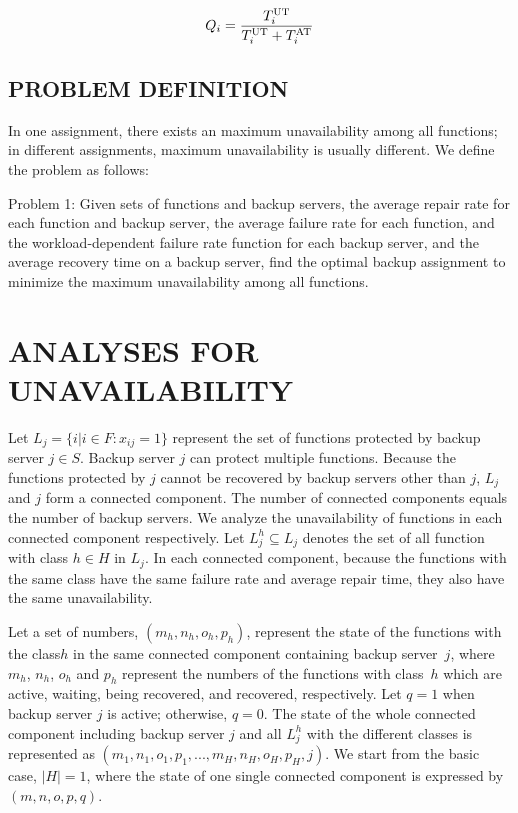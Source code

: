 \documentclass[conference]{IEEEtran}
\begin{document}
\begin{equation}
    Q_i=\frac{T_i^{\rm{UT}}}{T_i^{\rm{UT}}+T_i^{\rm{AT}}}
\end{equation}


\subsection{PROBLEM DEFINITION}
In one assignment, there exists an maximum unavailability among all functions; in different assignments, maximum unavailability is usually different. We define the problem as follows:

Problem 1: Given sets of functions and backup servers, the average repair rate for each function and backup server, the average failure rate for each function, and the workload-dependent failure rate function for each backup server, and the average recovery time on a backup server, find the optimal backup assignment to minimize the maximum unavailability among all functions.


\section{ANALYSES FOR UNAVAILABILITY}
Let $L_j=\{i|i \in F : x_{ij}=1\}$  represent the set of functions protected by backup server $j \in S$.  Backup server $j$ can protect multiple functions. Because the functions protected by $j$ cannot be recovered by backup servers other than $j$, $L_j$ and $j$ form a connected component. The number of connected components equals the number of backup servers. We analyze the unavailability of functions in each connected component respectively. Let $L_j^h \subseteq L_j$ denotes the set of all function with class $h \in H$ in $L_j$. In each connected component, because the functions with the same class have the same failure rate and average repair time, they also have the same unavailability.

Let a set of numbers, $(m_h,n_h,o_h,p_h)$, represent the state of the functions with the class$h$ in the same connected component containing backup server~$j$, where $m_h$, $n_h$, $o_h$ and $p_h$ represent the numbers of the functions with class~$h$ which are active, waiting, being recovered, and recovered, respectively. Let $q=1$ when backup server $j$ is active; otherwise, $q=0$. The state of the whole connected component including backup server $j$ and all $L_j^h$ with the different classes is represented as $(m_1, n_1, o_1, p_1,...,m_H, n_H, o_H, p_H, j)$. We start from the basic case, $|H|=1$, where the state of one single connected component is expressed by $(m,n,o,p,q)$.
\end{document}

